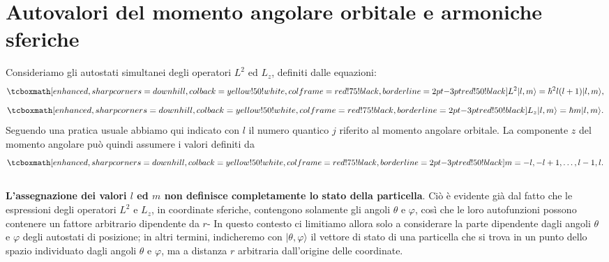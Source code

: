 \documentclass[a4paper,12pt,oneside]{book}
\begin{document}
\section[Autovalori del momento angolare orbitale e armoniche sferiche]{Autovalori del momento angolare orbitale e armoniche sferiche}
Consideriamo gli autostati simultanei degli operatori $L^2$ ed $L_z$, definiti dalle equazioni:
	\begin{equation}
		 \tcboxmath[enhanced, sharp corners=downhill, colback=yellow!50!white, colframe=red!75!black, borderline={2pt}{-3pt}{red!50!black}]{
			L^2 \vert l, m \rangle = \hbar ^2 l(l+1) \vert l, m \rangle ,\label{eq:cap17_6}
		}
	\end{equation}
	\begin{equation}
		\tcboxmath[enhanced, sharp corners=downhill, colback=yellow!50!white, colframe=red!75!black, borderline={2pt}{-3pt}{red!50!black}]{
L_z \vert l, m \rangle = \hbar m \vert l, m \rangle
\label{eq:cap17_7}.
		}
	\end{equation}
Seguendo una pratica usuale abbiamo qui indicato con $l$ il numero quantico $j$ riferito al momento angolare orbitale. La componente $z$ del momento angolare può quindi assumere i valori definiti da
	\begin{equation}
		\tcboxmath[enhanced, sharp corners=downhill, colback=yellow!50!white, colframe=red!75!black, borderline={2pt}{-3pt}{red!50!black}]{
			m = -l, -l+1, \dots,l-1, l .
			}
	\end{equation}\\

\textbf{L'assegnazione dei valori $l$ ed $m$ non definisce completamente lo stato della particella}. Ciò è evidente già dal fatto che le espressioni degli operatori $L^2$ e $L_z$, in coordinate sferiche, contengono solamente gli angoli $\theta$ e $\varphi$, così che le loro autofunzioni possono contenere un fattore arbitrario dipendente da $r$- In questo contesto ci limitiamo allora solo a considerare la parte dipendente dagli angoli $\theta$ e $\varphi$ degli autostati di posizione; in altri termini, indicheremo con $\vert \theta ,\varphi\rangle$ il vettore di stato di una particella che si trova in un punto dello spazio individuato dagli angoli $\theta $ e $\varphi$, ma a distanza $r$ arbitraria dall'origine delle coordinate.\\
\end{document}
